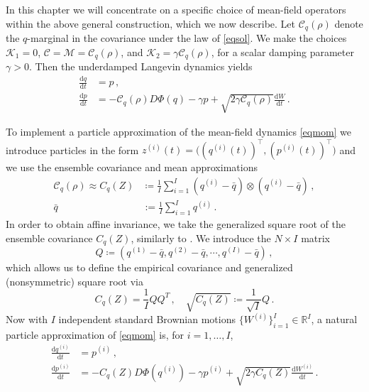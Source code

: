 \documentclass[12pt]{caltech_thesis}
\numberwithin{equation}{section}
\begin{document}
{In this chapter we will concentrate on a specific choice of mean-field operators within
the above general construction, which we now describe.} Let $\mathcal{C}_q(\rho)$ denote the $q$-marginal in the covariance 
under the law of \eqref{eqsol}. We make the choices
{$\mathcal{K}_{1}=0$, $\mathcal{C}=\mathcal{M}=\mathcal{C}_q(\rho)$, and $\mathcal{K}_2=\gamma\mathcal{C}_q(\rho)$, for a scalar damping parameter $\gamma>0$.} Then the underdamped Langevin dynamics yields
\begin{equation}
\label{eqmom}
\begin{aligned}
\frac{\mathrm{d} q}{\mathrm{d} t}&= p\,, \\
\frac{\mathrm{d} p}{\mathrm{d} t}&=-\mathcal{C}_q(\rho)D \Phi(q)- {\gamma p+\sqrt{2\gamma \mathcal{C}_q(\rho)} \frac{\mathrm{d} W}{\mathrm{d} t}}\,.
\end{aligned}
\end{equation}

{To implement a particle approximation of the}
mean-field dynamics \eqref{eqmom} {we introduce  particles in the form} $z^{(i)}(t)=\bigl( (q^{(i)}(t))^\top, (p^{(i)}(t))^\top\bigr)$  and
we use the {ensemble covariance and mean approximations}
\begin{subequations}
\label{eq:ecov}
\begin{align}
    \mathcal{C}_q(\rho)\approx C_q(Z)&\coloneqq\frac{1}{I} \sum_{i=1}^{I}\left(q^{(i)}-\bar{q}\right) \otimes\left(q^{(i)}-\bar{q}\right)\,,\\
    \bar{q}&:=\frac{1}{I} \sum_{i=1}^{I}q^{(i)}\,.
\end{align}
\end{subequations}
 In order to 
{obtain} affine invariance, we take the generalized square root of the ensemble covariance $C_q(Z)$, {similarly} to \cite{garbuno2020affine}.  We introduce the $N\times I$ matrix $$Q \coloneqq\left(q^{(1)}-\bar{q},q^{(2)}-\bar{q},\cdots,q^{(I)}-\bar{q}\right)\,,$$ which allows us to  
define the empirical covariance and generalized (nonsymmetric) square root  via
$${C}_q(Z)=\frac{1}{{I}} QQ^T\,,\quad
\sqrt{{C}_q(Z)}\coloneqq\frac{1}{\sqrt{I}} Q\,.$$ 
Now with $I$ independent standard Brownian motions $\{ W^{(i)} \}_{i=1}^I\in \mathbb{R}^{I}$, a natural
particle approximation of \eqref{eqmom} is, for $i=1, \dots, I$,
\begin{equation}
\label{ensol}
\begin{aligned}
\frac{\mathrm{d} q^{(i)}}{\mathrm{d} t}&= p^{(i)}\,, \\
\frac{\mathrm{d} p^{(i)}}{\mathrm{d} t}&=-C_q(Z)D \Phi(q^{(i)})- {\gamma p^{(i)}+\sqrt{2 \gamma C_q(Z)} \frac{\mathrm{d} W^{(i)}}{\mathrm{d} t}}\,.
\end{aligned}
\end{equation}
\end{document}

